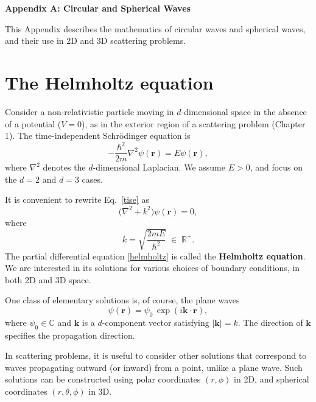 \documentclass[pra,12pt]{revtex4}
\begin{document}
\begin{center}
{\large \textbf{Appendix A: Circular and Spherical Waves}}
\end{center}

This Appendix describes the mathematics of circular waves and
spherical waves, and their use in 2D and 3D scattering problems.

\section{The Helmholtz equation}

Consider a non-relativistic particle moving in $d$-dimensional space
in the absence of a potential ($V = 0$), as in the exterior region of
a scattering problem (Chapter 1).  The time-independent Schr\"odinger
equation is
\begin{equation}
  -\frac{\hbar^2}{2m}\nabla^2 \psi(\mathbf{r}) = E \psi(\mathbf{r}),
  \label{tise}
\end{equation}
where $\nabla^2$ denotes the $d$-dimensional Laplacian.  We assume $E
> 0$, and focus on the $d = 2$ and $d = 3$ cases.

It is convenient to rewrite Eq.~\eqref{tise} as
\begin{equation}
  \Big(\nabla^2 + k^2\Big) \psi(\mathbf{r}) = 0,
  \label{helmholtz}
\end{equation}
where
\begin{equation}
  k = \sqrt{\frac{2mE}{\hbar^2}} \;\in\; \mathbb{R}^+.
  \label{kparm}
\end{equation}
The partial differential equation \eqref{helmholtz} is called the
\textbf{Helmholtz equation}.  We are interested in its solutions for
various choices of boundary conditions, in both 2D and 3D space.

One class of elementary solutions is, of course, the plane waves
\begin{equation}
  \psi(\mathbf{r}) = \psi_0 \, \exp\left(i\mathbf{k}\cdot\mathbf{r}\right),
  \label{planewaves}
\end{equation}
where $\psi_0 \in \mathbb{C}$ and $\mathbf{k}$ is a $d$-component
vector satisfying $|\mathbf{k}| = k$.  The direction of $\mathbf{k}$
specifies the propagation direction.

In scattering problems, it is useful to consider other solutions that
correspond to waves propagating outward (or inward) from a point,
unlike a plane wave.  Such solutions can be constructed using polar
coordinates $(r, \phi)$ in 2D, and spherical coordinates
$(r,\theta,\phi)$ in 3D.
\end{document}
